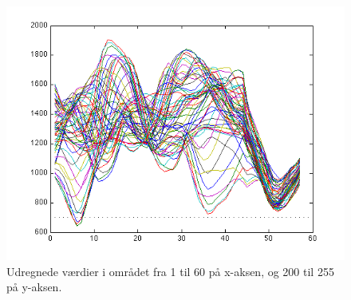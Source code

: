 \begin{figure}[H]
		\centering
		\includegraphics[scale=0.9]{files/postmethod/img/conv_lines_2.png}
	\caption{Udregnede værdier i området fra 1 til 60 på x-aksen, og 200 til 255 på y-aksen. \label{fig:postmethod_conv_lines_2}}
\end{figure}

